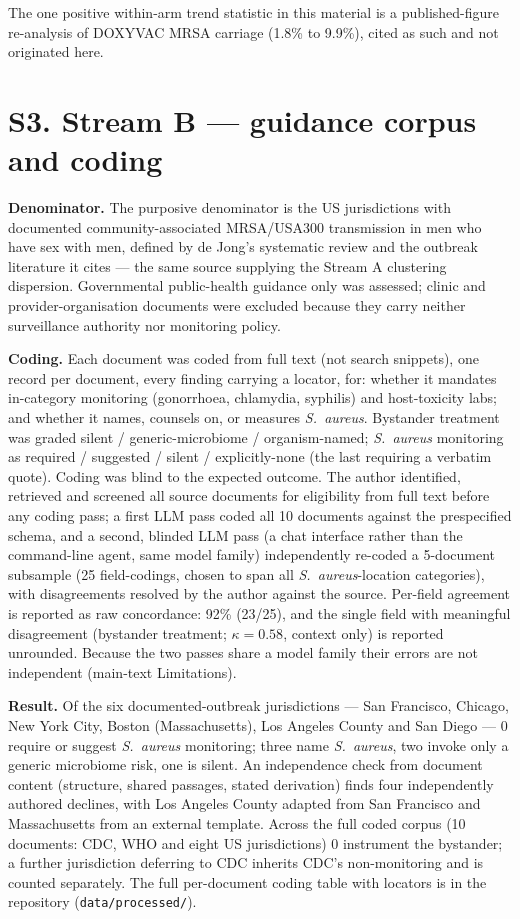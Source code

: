 \documentclass[11pt,a4paper]{article}
\newcommand{\sa}{\emph{S.~aureus}}
\begin{document}
The one positive within-arm trend statistic in this material is a published-figure
re-analysis of DOXYVAC MRSA carriage (1.8\% to 9.9\%), cited as such and not
originated here.

\section*{S3. Stream B --- guidance corpus and coding}

\textbf{Denominator.} The purposive denominator is the US jurisdictions with
documented community-associated MRSA/USA300 transmission in men who have sex with
men, defined by de Jong's systematic review and the outbreak literature it cites
--- the same source supplying the Stream A clustering dispersion. Governmental
public-health guidance only was assessed; clinic and provider-organisation
documents were excluded because they carry neither surveillance authority nor
monitoring policy.

\textbf{Coding.} Each document was coded from full text (not search snippets), one
record per document, every finding carrying a locator, for: whether it mandates
in-category monitoring (gonorrhoea, chlamydia, syphilis) and host-toxicity labs;
and whether it names, counsels on, or measures \sa{}. Bystander treatment was
graded silent / generic-microbiome / organism-named; \sa{} monitoring as required
/ suggested / silent / explicitly-none (the last requiring a verbatim quote).
Coding was blind to the expected outcome. The author identified, retrieved and
screened all source documents for eligibility from full text before any coding
pass; a first LLM pass coded all 10 documents against the prespecified schema, and
a second, blinded LLM pass (a chat interface rather than the command-line agent,
same model family) independently re-coded a 5-document subsample (25 field-codings,
chosen to span all \sa{}-location categories), with disagreements resolved by the
author against the source. Per-field agreement is reported as raw concordance:
92\% (23/25), and the single field with meaningful disagreement (bystander
treatment; $\kappa=0.58$, context only) is reported unrounded. Because the two
passes share a model family their errors are not independent (main-text
Limitations).

\textbf{Result.} Of the six documented-outbreak jurisdictions --- San Francisco,
Chicago, New York City, Boston (Massachusetts), Los Angeles County and San Diego
--- 0 require or suggest \sa{} monitoring; three name \sa{}, two invoke only a
generic microbiome risk, one is silent. An independence check from document
content (structure, shared passages, stated derivation) finds four independently
authored declines, with Los Angeles County adapted from San Francisco and
Massachusetts from an external template. Across the full coded corpus (10
documents: CDC, WHO and eight US jurisdictions) 0 instrument the bystander; a
further jurisdiction deferring to CDC inherits CDC's non-monitoring and is counted
separately. The full per-document coding table with locators is in the repository
(\texttt{data/processed/}).
\end{document}
